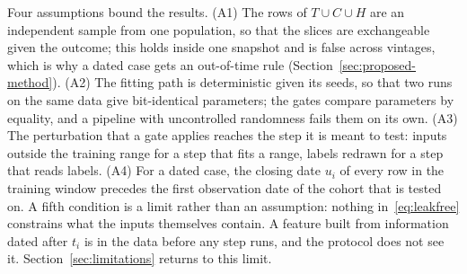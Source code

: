 Four assumptions bound the results. (A1) The rows of $T\cup C\cup H$ are an independent sample from one population, so that the slices are exchangeable given the outcome; this holds inside one snapshot and is false across vintages, which is why a dated case gets an out-of-time rule (Section~\ref{sec:proposed-method}). (A2) The fitting path is deterministic given its seeds, so that two runs on the same data give bit-identical parameters; the gates compare parameters by equality, and a pipeline with uncontrolled randomness fails them on its own. (A3) The perturbation that a gate applies reaches the step it is meant to test: inputs outside the training range for a step that fits a range, labels redrawn for a step that reads labels. (A4) For a dated case, the closing date $u_i$ of every row in the training window precedes the first observation date of the cohort that is tested on. A fifth condition is a limit rather than an assumption: nothing in~\eqref{eq:leakfree} constrains what the inputs themselves contain. A feature built from information dated after $t_i$ is in the data before any step runs, and the protocol does not see it. Section~\ref{sec:limitations} returns to this limit.
